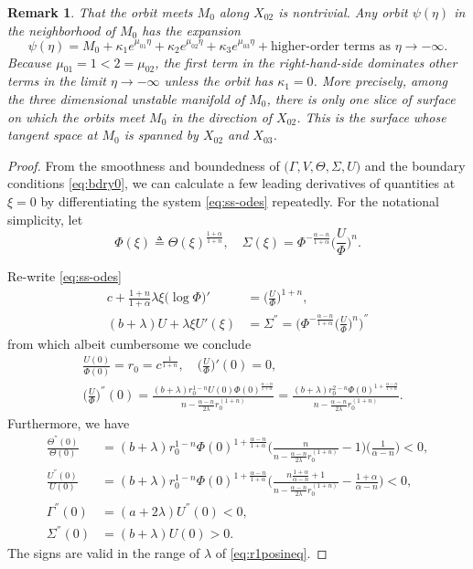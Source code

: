 \documentclass[a4paper,11pt]{article}
\newtheorem{remark}{Remark}[section]
\begin{document}
\begin{remark} \label{rem:alpha}
  That the orbit meets $M_0$ along $X_{02}$ is nontrivial. Any orbit $\psi(\eta)$ in the neighborhood of $M_0$ has the expansion
  $$  \psi(\eta) = M_0 + \kappa_1 e^{\mu_{01}\eta} + \kappa_2 e^{\mu_{02}\eta} + \kappa_3 e^{\mu_{03}\eta} + \text{higher-order terms as $\eta \rightarrow -\infty$}.$$
  Because $\mu_{01}=1<2=\mu_{02}$, the first term in the right-hand-side dominates other terms in the limit $\eta \rightarrow -\infty$ unless the orbit has $\kappa_1=0$. More precisely, among the three dimensional unstable manifold of $M_0$, there is only one slice of surface on which the orbits meet $M_0$ in the direction of $X_{02}$. This is the surface whose tangent space at $M_0$ is spanned by $X_{02}$ and $X_{03}$.
\end{remark}
\begin{proof}
From the smoothness and boundedness of $\big(\Gamma,V,\Theta,\Sigma,U\big)$ and the boundary conditions \eqref{eq:bdry0}, we can calculate a few leading derivatives of quantities at $\xi=0$ by differentiating the system \eqref{eq:ss-odes} repeatedly. For the notational simplicity, let
$$\Phi(\xi) \triangleq \Theta(\xi)^{\frac{1+\alpha}{1+n}}, \quad \Sigma(\xi) = \Phi^{-\frac{\alpha-n}{1+\alpha}} \Big(\frac{U}{\Phi}\Big)^n.$$

Re-write \eqref{eq:ss-odes}
\begin{align*}
  c + \frac{1+n}{1+\alpha} \lambda \xi \big(\log\Phi\big)' &= \Big(\frac{U}{\Phi}\Big)^{1+n},\\
  (b+\lambda)U  + \lambda \xi U'(\xi) &= \Sigma^{''} = \Big(\Phi^{-\frac{\alpha-n}{1+\alpha}}\Big(\frac{U}{\Phi}\Big)^{n}\Big)^{''}
\end{align*}
from which albeit cumbersome we conclude
\begin{align*}
&\frac{U(0)}{\Phi(0)} = r_0 = c^{\frac{1}{1+n}},  \quad \Big(\frac{U}{\Phi}\Big)'(0)=0, \\
&\Big(\frac{U}{\Phi}\Big)^{''}(0) = \frac{ (b+\lambda) r_0^{1-n} U(0)\Phi(0)^{\frac{\alpha-n}{1+\alpha}} }{ n - \frac{\alpha-n}{2\lambda}r_0^{(1+n)}} = \frac{ (b+\lambda) r_0^{2-n} \Phi(0)^{1+\frac{\alpha-n}{1+\alpha}} }{ n - \frac{\alpha-n}{2\lambda}r_0^{(1+n)}}.
\end{align*}
Furthermore, we have
\begin{equation} \label{eq:second_der}
\begin{aligned}
\frac{\Theta^{''}(0)}{\Theta(0)} &= (b+\lambda)r_0^{1-n}\Phi(0)^{1+\frac{\alpha-n}{1+\alpha}} \Big(\frac{n}{ n - \frac{\alpha-n}{2\lambda}r_0^{(1+n)}} -1\Big)\Big(\frac{1}{\alpha-n}\Big) < 0,\\
\frac{U^{''}(0)}{U(0)} &=(b+\lambda)r_0^{1-n}\Phi(0)^{1+\frac{\alpha-n}{1+\alpha}} \Big(\frac{n\frac{1+\alpha}{\alpha-n}+1}{ n - \frac{\alpha-n}{2\lambda}r_0^{(1+n)}} -\frac{1+\alpha}{\alpha-n}\Big) < 0,\\
\Gamma^{''}(0)&=(a+2\lambda)U^{''}(0) <0,\\
\Sigma^{''}(0)&=(b+\lambda)U(0)>0.
\end{aligned}
\end{equation}
The signs are valid in the range of $\lambda$ of \eqref{eq:r1posineq}.


\end{proof}
\end{document}
